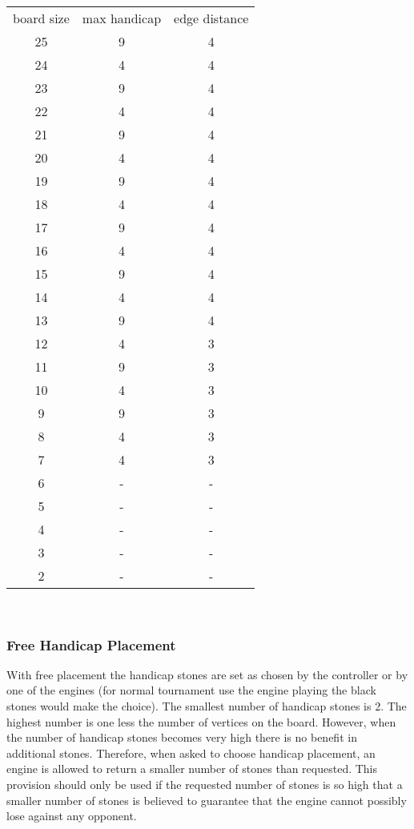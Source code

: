 \documentclass[a4paper]{article}
\begin{document}
\begin{tabular}{ccc}
board size & max handicap & edge distance \\
25 & 9 & 4 \\
24 & 4 & 4 \\
23 & 9 & 4 \\
22 & 4 & 4 \\
21 & 9 & 4 \\
20 & 4 & 4 \\
19 & 9 & 4 \\
18 & 4 & 4 \\
17 & 9 & 4 \\
16 & 4 & 4 \\
15 & 9 & 4 \\
14 & 4 & 4 \\
13 & 9 & 4 \\
12 & 4 & 3 \\
11 & 9 & 3 \\
10 & 4 & 3 \\
 9 & 9 & 3 \\
 8 & 4 & 3 \\
 7 & 4 & 3 \\
 6 & - & - \\
 5 & - & - \\
 4 & - & - \\
 3 & - & - \\
 2 & - & - \\
\end{tabular} \\

\subsubsection{Free Handicap Placement}
\label{sec:free-handicap-placement}

With free placement the handicap stones are set as chosen by the
controller or by one of the engines (for normal tournament use the
engine playing the black stones would make the choice). The smallest
number of handicap stones is 2. The highest number is one less the
number of vertices on the board. However, when the number of handicap
stones becomes very high there is no benefit in additional stones.
Therefore, when asked to choose handicap placement, an engine is
allowed to return a smaller number of stones than requested. This
provision should only be used if the requested number of stones is so
high that a smaller number of stones is believed to guarantee that the
engine cannot possibly lose against any opponent.
\end{document}
